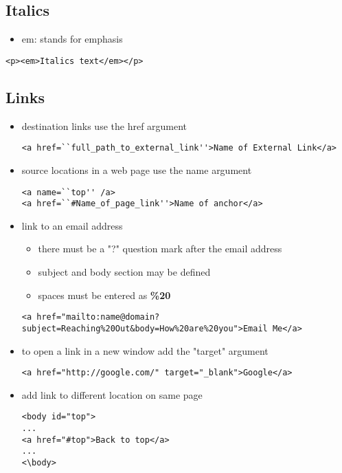 \documentclass{article}
\begin{document}
\subsection{Italics}
\begin{itemize}
  \item em: stands for emphasis
\end{itemize}

\begin{lstlisting}
<p><em>Italics text</em></p>
\end{lstlisting}

\subsection{Links}
\begin{itemize}
  \item destination links use the href argument

\begin{lstlisting}
<a href=``full_path_to_external_link''>Name of External Link</a>
\end{lstlisting}

  \item source locations in a web page use the name argument

\begin{lstlisting}
<a name=``top'' /a>
<a href=``#Name_of_page_link''>Name of anchor</a>
\end{lstlisting}

  \item link to an email address
    \begin{itemize}
      \item there must be a "?" question mark after the email address
      \item subject and body section may be defined
      \item spaces must be entered as \textbf{\%20}
    \end{itemize}

\begin{lstlisting}
<a href="mailto:name@domain?subject=Reaching%20Out&body=How%20are%20you">Email Me</a>
\end{lstlisting}

  \item to open a link in a new window add the "target" argument

\begin{lstlisting}
<a href="http://google.com/" target="_blank">Google</a>
\end{lstlisting}

  \item add link to different location on same page

\begin{lstlisting}
<body id="top">
...
<a href="#top">Back to top</a>
...
<\body>

\end{lstlisting}

\end{itemize}
\end{document}
